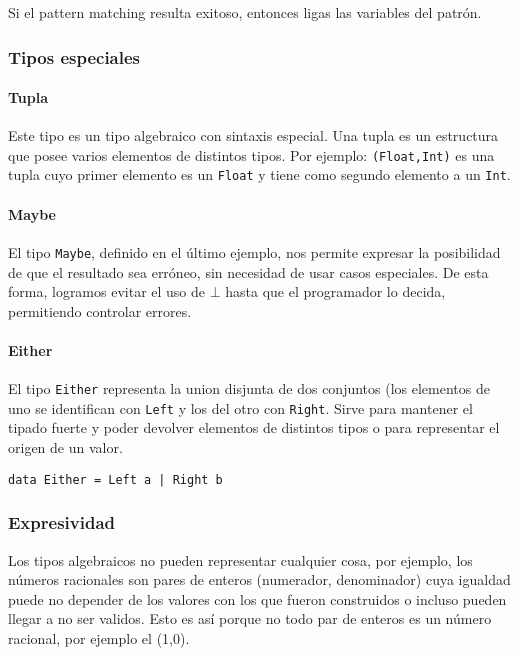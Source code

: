Si el pattern matching resulta exitoso, entonces ligas las variables del patrón.

\subsubsection{Tipos especiales}
\paragraph{Tupla} Este tipo es un tipo algebraico con sintaxis especial. Una tupla es un estructura que posee varios elementos de distintos tipos. Por ejemplo: \texttt{(Float,Int)} es una tupla cuyo primer elemento es un \texttt{Float} y tiene como segundo elemento a un \texttt{Int}.

\paragraph{Maybe} El tipo \texttt{Maybe}, definido en el último ejemplo, nos permite expresar la posibilidad de que el resultado sea erróneo, sin necesidad de usar casos especiales. De esta forma, logramos evitar el uso de $\bot$ hasta que el programador lo decida, permitiendo controlar errores.

\paragraph{Either} El tipo \texttt{Either} representa la union disjunta de dos conjuntos (los elementos de uno se identifican con \texttt{Left} y los del otro con \texttt{Right}. Sirve para mantener el tipado fuerte y poder devolver elementos de distintos tipos o para representar el origen de un valor.
\begin{centrado}
	\begin{verbatim}
data Either = Left a | Right b
	\end{verbatim}
\end{centrado}

\subsubsection{Expresividad}
Los tipos algebraicos no pueden representar cualquier cosa, por ejemplo, los números racionales son pares de enteros (numerador, denominador) cuya igualdad puede no depender de los valores con los que fueron construidos o incluso pueden llegar a no ser validos. Esto es así porque no todo par de enteros es un número racional, por ejemplo el (1,0). 

